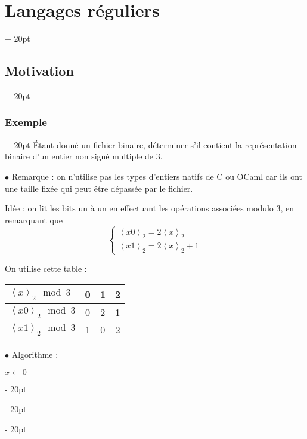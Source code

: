 \documentclass[a4paper, 12pt, twoside]{article}
\newenvironment{indalgo}[2][H]{
    \begin{minipage}{\linewidth-\leftskip-5pt}
        \begin{algorithm}[#1]
            \caption{#2}
}
{
        \end{algorithm}
    \end{minipage}
}
\newcommand{\lrangle}[1]{\left\langle #1 \right\rangle}
\newcommand{\ind}[1][20pt]{\advance\leftskip + #1}
\newcommand{\deind}[1][20pt]{\advance\leftskip - #1}
\newenvironment{indt}[2][20pt]{#2 \par \ind[#1]}{\par \deind} %
\begin{document}
\begin{indt}{\section{Langages réguliers}}
\begin{indt}{\subsection{Motivation}}
\begin{indt}{\subsubsection{Exemple}}
                \'Etant donné un fichier binaire, déterminer s'il contient la représentation binaire d'un entier non signé multiple de 3.

                \vspace{6pt}
                
                $\bullet$ Remarque : on n'utilise pas les types d'entiers natifs de C ou OCaml car ils ont une taille fixée qui peut être dépassée par le fichier.

                \vspace{6pt}
                
                Idée : on lit les bits un à un en effectuant les opérations associées modulo 3, en remarquant que
                \[
                    \begin{cases}
                        \lrangle{x 0}_2 = 2\lrangle x _2
                        \\
                        \lrangle{x 1}_2 = 2\lrangle x _2 + 1
                    \end{cases}
                \]

                On utilise cette table :

                \begin{center}
                    \begin{tabular}{|l|c|c|c|}
                        \hline
                        $\lrangle x _2 \mod 3$ & 0 & 1 & 2
                        \\
                        \hline
                        $\lrangle{x 0}_2 \mod 3$ & 0 & 2 & 1
                        \\
                        \hline
                        $\lrangle{x 1}_2 \mod 3$ & 1 & 0 & 2
                        \\
                        \hline
                    \end{tabular}
                \end{center}

                $\bullet$ Algorithme :

                \begin{indalgo}{}
                    $x \gets 0$\;



\end{indalgo}
\end{indt}
\end{indt}
\end{indt}
\end{document}
